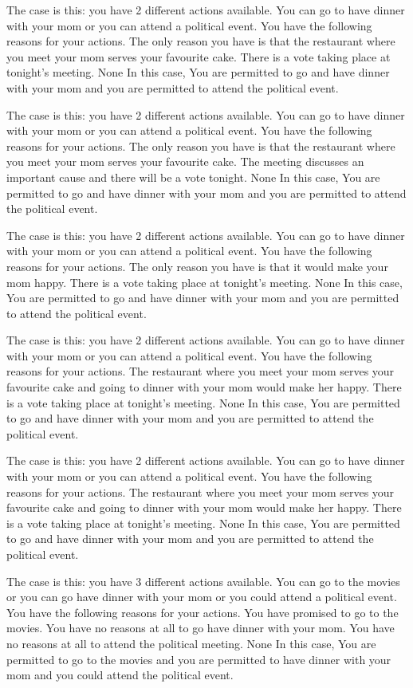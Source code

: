 The case is this: you have  2  different actions available.  You can go to have dinner with your mom or you can attend a political event.
You have the following reasons for your actions.  The only reason you have is that the restaurant where you meet your mom serves your favourite cake. There is a vote taking place at tonight's meeting. 
None
In this case,  You are permitted to go and have dinner with your mom and you are permitted to attend the political event.
 
The case is this: you have  2  different actions available.  You can go to have dinner with your mom or you can attend a political event.
You have the following reasons for your actions.  The only reason you have is that the restaurant where you meet your mom serves your favourite cake. The meeting discusses an important cause and there will be a vote tonight. 
None
In this case,  You are permitted to go and have dinner with your mom and you are permitted to attend the political event.
 
The case is this: you have  2  different actions available.  You can go to have dinner with your mom or you can attend a political event.
You have the following reasons for your actions.  The only reason you have is that it would make your mom happy. There is a vote taking place at tonight's meeting. 
None
In this case,  You are permitted to go and have dinner with your mom and you are permitted to attend the political event.
 
The case is this: you have  2  different actions available.  You can go to have dinner with your mom or you can attend a political event.
You have the following reasons for your actions.  The restaurant where you meet your mom serves your favourite cake and going to dinner with your mom would make her happy. There is a vote taking place at tonight's meeting. 
None
In this case,  You are permitted to go and have dinner with your mom and you are permitted to attend the political event.
 
The case is this: you have  2  different actions available.  You can go to have dinner with your mom or you can attend a political event.
You have the following reasons for your actions.  The restaurant where you meet your mom serves your favourite cake and going to dinner with your mom would make her happy. There is a vote taking place at tonight's meeting. 
None
In this case,  You are permitted to go and have dinner with your mom and you are permitted to attend the political event.
 
The case is this: you have  3  different actions available.  You can go to the movies or you can go have dinner with your mom or you could attend a political event.
You have the following reasons for your actions.  You have promised to go to the movies. You have no reasons at all to go have dinner with your mom. You have no reasons at all to attend the political meeting. 
None
In this case,  You are permitted to go to the movies and you are permitted to have dinner with your mom and you could attend the political event.
 
